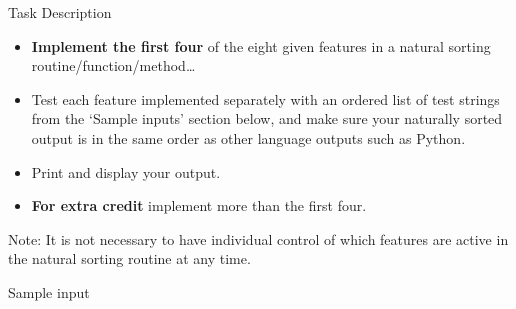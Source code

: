 \pagebreak{}
Task Description

\begin{itemize}
\item
  \textbf{Implement the first four} of the eight given features in a
  natural sorting routine/function/method\ldots{}
\item
  Test each feature implemented separately with an ordered list of test
  strings from the `Sample inputs' section below, and make sure your
  naturally sorted output is in the same order as other language outputs
  such as Python.
\item
  Print and display your output.
\end{itemize}

\begin{itemize}
\item
  \textbf{For extra credit} implement more than the first four.
\end{itemize}

Note: It is not necessary to have individual control of which features
are active in the natural sorting routine at any time.

\begin{description}
\item[Sample input]
\end{description}

